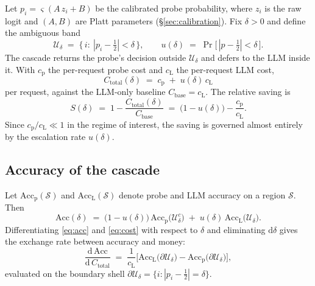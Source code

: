 Let $p_i=\varsigma(A\,z_i+B)$ be the calibrated probe probability, where $z_i$ is the raw
logit and $(A,B)$ are Platt parameters (\S\ref{sec:calibration}). Fix $\delta>0$ and
define the ambiguous band
\begin{equation}
  \mathcal{U}_\delta \;=\;\big\{\,i:\ |p_i-\tfrac12|<\delta\,\big\},
  \qquad
  u(\delta)\;=\;\Pr\big[\,|p-\tfrac12|<\delta\,\big].
  \label{eq:band}
\end{equation}
The cascade returns the probe's decision outside $\mathcal{U}_\delta$ and defers to the
LLM inside it. With $c_{\mathrm{p}}$ the per-request probe cost and
$c_{\mathrm{L}}$ the per-request LLM cost,
\begin{equation}
  \boxed{\;
  C_{\mathrm{total}}(\delta)\;=\;c_{\mathrm{p}}\;+\;u(\delta)\,c_{\mathrm{L}}\;}
  \label{eq:cost}
\end{equation}
per request, against the LLM-only baseline $C_{\mathrm{base}}=c_{\mathrm{L}}$. The
relative saving is
\begin{equation}
  S(\delta)\;=\;1-\frac{C_{\mathrm{total}}(\delta)}{C_{\mathrm{base}}}
  \;=\;\big(1-u(\delta)\big)-\frac{c_{\mathrm{p}}}{c_{\mathrm{L}}} .
  \label{eq:saving}
\end{equation}
Since $c_{\mathrm{p}}/c_{\mathrm{L}}\ll 1$ in the regime of interest, the saving is
governed almost entirely by the escalation rate $u(\delta)$.

\subsection{Accuracy of the cascade}

Let $\mathrm{Acc}_{\mathrm{p}}(\mathcal{S})$ and $\mathrm{Acc}_{\mathrm{L}}(\mathcal{S})$
denote probe and LLM accuracy on a region $\mathcal{S}$. Then
\begin{equation}
  \mathrm{Acc}(\delta)
  \;=\;\big(1-u(\delta)\big)\,\mathrm{Acc}_{\mathrm{p}}\!\big(\mathcal{U}_\delta^{c}\big)
      \;+\;u(\delta)\,\mathrm{Acc}_{\mathrm{L}}\!\big(\mathcal{U}_\delta\big).
  \label{eq:acc}
\end{equation}
Differentiating \eqref{eq:acc} and \eqref{eq:cost} with respect to $\delta$ and
eliminating $\mathrm{d}\delta$ gives the exchange rate between accuracy and money:
\begin{equation}
  \frac{\mathrm{d}\,\mathrm{Acc}}{\mathrm{d}\,C_{\mathrm{total}}}
  \;=\;\frac{1}{c_{\mathrm{L}}}\Big[
      \mathrm{Acc}_{\mathrm{L}}\!\big(\partial\mathcal{U}_\delta\big)
      -\mathrm{Acc}_{\mathrm{p}}\!\big(\partial\mathcal{U}_\delta\big)\Big],
  \label{eq:exchange}
\end{equation}
evaluated on the boundary shell $\partial\mathcal{U}_\delta=\{i:|p_i-\frac12|=\delta\}$.

